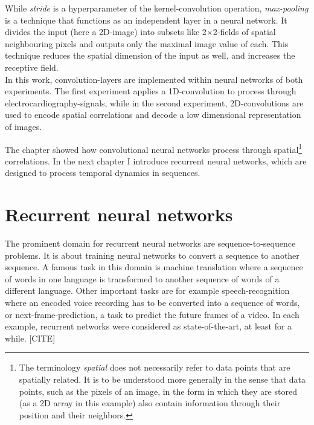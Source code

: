 While \textit{stride} is a hyperparameter of the kernel-convolution operation, \textit{max-pooling} is a technique that functions as an independent layer in a neural network. It divides the input (here a 2D-image) into subsets like 2$\times$2-fields of spatial neighbouring pixels and outputs only the maximal image value of each. This technique reduces the spatial dimension of the input as well, and increases the receptive field. \\

In this work, convolution-layers are implemented within neural networks of both experiments. The first experiment applies a 1D-convolution to process through electrocardiography-signals, while in the second experiment, 2D-convolutions are used to encode spatial correlations and decode a low dimensional representation of images.

The chapter showed how convolutional neural networks process through spatial\footnote{The terminology \textit{spatial} does not necessarily refer to data points that are spatially related. It is to be understood more generally in the sense that data points, such as the pixels of an image, in the form in which they are stored (as a 2D array in this example) also contain information through their position and their neighbors.} correlations. In the next chapter I introduce recurrent neural networks, which are designed to process temporal dynamics in sequences.

\section{Recurrent neural networks}
The prominent domain for recurrent neural networks are sequence-to-sequence problems.
It is about training neural networks to convert a sequence to another sequence. A famous task in this domain is machine translation where a sequence of words in one language is transformed to another sequence of words of a different language. Other important tasks are for example speech-recognition where an encoded voice recording has to be converted into a sequence of words, or next-frame-prediction, a task to predict the future frames of a video. In each example, recurrent networks were considered as state-of-the-art, at least for a while. [CITE]


